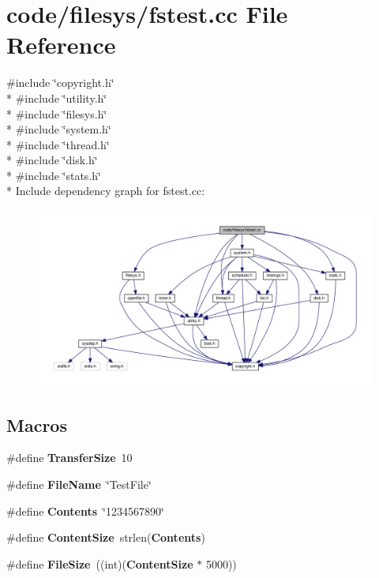 \section{code/filesys/fstest.cc File Reference}
\label{fstest_8cc}
{\ttfamily \#include \char`\"{}copyright.\+h\char`\"{}}\\*
{\ttfamily \#include \char`\"{}utility.\+h\char`\"{}}\\*
{\ttfamily \#include \char`\"{}filesys.\+h\char`\"{}}\\*
{\ttfamily \#include \char`\"{}system.\+h\char`\"{}}\\*
{\ttfamily \#include \char`\"{}thread.\+h\char`\"{}}\\*
{\ttfamily \#include \char`\"{}disk.\+h\char`\"{}}\\*
{\ttfamily \#include \char`\"{}stats.\+h\char`\"{}}\\*
Include dependency graph for fstest.\+cc\+:
\nopagebreak
\begin{figure}[H]
\begin{center}
\leavevmode
\includegraphics[width=350pt]{fstest_8cc__incl}
\end{center}
\end{figure}
\subsection*{Macros}
\begin{DoxyCompactItemize}
\item 
\#define {\bf Transfer\+Size}~10
\item 
\#define {\bf File\+Name}~\char`\"{}Test\+File\char`\"{}
\item 
\#define {\bf Contents}~\char`\"{}1234567890\char`\"{}
\item 
\#define {\bf Content\+Size}~strlen({\bf Contents})
\item 
\#define {\bf File\+Size}~((int)({\bf Content\+Size} $\ast$ 5000))
\end{DoxyCompactItemize}

